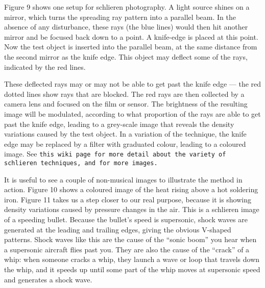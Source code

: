   Figure 9 shows one setup for schlieren photography. A light source shines on 
  a mirror, which turns the spreading ray pattern into a parallel beam. In the 
  absence of any disturbance, these rays (the blue lines) would then hit 
  another mirror and be focused back down to a point. A knife-edge is placed at 
  this point. Now the test object is inserted into the parallel beam, at the 
  same distance from the second mirror as the knife edge. This object may 
  deflect some of the rays, indicated by the red lines. 


  These deflected rays may or may not be able to get past the knife edge — the 
  red dotted lines show rays that are blocked. The red rays are then collected 
  by a camera lens and focused on the film or sensor. The brightness of the 
  resulting image will be modulated, according to what proportion of the rays 
  are able to get past the knife edge, leading to a grey-scale image that 
  reveals the density variations caused by the test object. In a variation of 
  the technique, the knife edge may be replaced by a filter with graduated 
  colour, leading to a coloured image. See \tt{}this wiki page\rm{} for more 
  detail about the variety of schlieren techniques, and for more images. 

  It is useful to see a couple of non-musical images to illustrate the method 
  in action. Figure 10 shows a coloured image of the heat rising above a hot 
  soldering iron. Figure 11 takes us a step closer to our real purpose, because 
  it is showing density variations caused by pressure changes in the air. This 
  is a schlieren image of a speeding bullet. Because the bullet’s speed is 
  supersonic, shock waves are generated at the leading and trailing edges, 
  giving the obvious V-shaped patterns. Shock waves like this are the cause of 
  the “sonic boom” you hear when a supersonic aircraft flies past you. They are 
  also the cause of the ``crack'' of a whip: when someone cracks a whip, they 
  launch a wave or loop that travels down the whip, and it speeds up until some 
  part of the whip moves at supersonic speed and generates a shock wave. 


